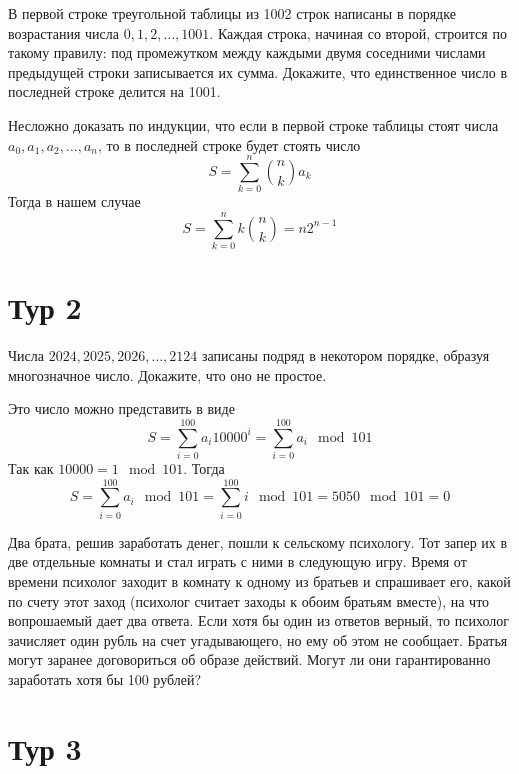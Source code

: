 \documentclass[11pt, a4paper]{common/document_template}
\begin{document}
\begin{exercise}
В первой строке треугольной таблицы из 1002 строк написаны в порядке возрастания числа $0, 1, 2, \dots, 1001$. Каждая строка, начиная со второй, строится по такому правилу: под промежутком между каждыми двумя соседними числами предыдущей строки записывается их сумма. Докажите, что единственное число в последней строке делится на 1001.
\end{exercise}

\begin{Solution}
Несложно доказать по индукции, что если в первой строке таблицы стоят числа $a_{0}, a_{1}, a_{2}, \dots, a_{n}$, то в последней строке будет стоять число
$$
S = \sum_{k = 0}^{n} \binom{n}{k} a_{k}
$$
Тогда в нашем случае
$$
S = \sum_{k = 0}^{n} k \binom{n}{k} = n 2^{n - 1}
$$
\end{Solution}

\section{Тур 2}

\begin{exercise}
Числа $2024, 2025, 2026, \dots, 2124$ записаны подряд в некотором порядке, образуя многозначное число. Докажите, что оно не простое.
\end{exercise}

\begin{Solution}
Это число можно представить в виде
$$
S = \sum_{i = 0}^{100} a_{i} 10000^{i} = \sum_{i = 0}^{100} a_{i} \mod 101
$$
Так как $10000 = 1 \mod 101$. Тогда 
$$
S = \sum_{i = 0}^{100} a_{i} \mod 101 =  \sum_{i = 0}^{100} i \mod 101 = 5050 \mod 101 = 0
$$
\end{Solution}

\begin{exercise}
Два брата, решив заработать денег, пошли к сельскому психологу. Тот запер их в две отдельные комнаты и стал играть с ними в следующую игру. Время от времени психолог заходит в комнату к одному из братьев и спрашивает его, какой по счету этот заход (психолог считает заходы к обоим братьям вместе), на что вопрошаемый дает два ответа. Если хотя бы один из ответов верный, то психолог зачисляет один рубль на счет угадывающего, но ему об этом не сообщает. Братья
могут заранее договориться об образе действий. Могут ли они гарантированно заработать хотя бы 100 рублей?
\end{exercise}

\section{Тур 3}
\end{document}
